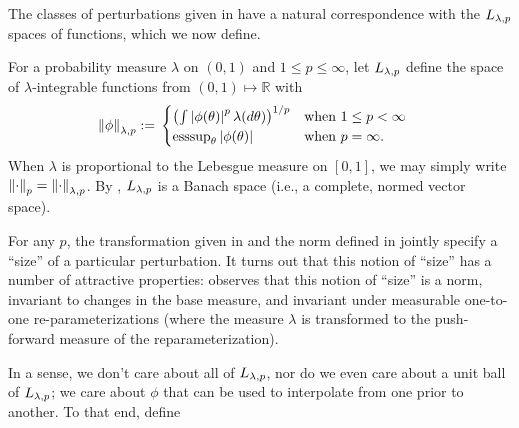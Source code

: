 The classes of perturbations given in  have a natural
correspondence with the ${L_{\lambda, p}}$ spaces of functions, which we now
define.


\begin{defn}
%
For a probability measure $\lambda$ on $(0,1)$ and $1 \le p \le \infty$, let
${L_{\lambda,p}}$ define the space of $\lambda$-integrable functions from
$(0,1)\mapsto\mathbb{R}$ with
%
\begin{align*}
%
\norm{\phi}_{\lambda,p} :={}&
\begin{cases}
    \left(\int \abs{\phi(\theta)}^p \lambda(d\theta)\right)^{1/p}
    & \textrm{when }1\le p < \infty\\
    \esssup_{\theta} \abs{\phi(\theta)}
    & \textrm{when }p = \infty.
\end{cases}
%
\end{align*}
%
When $\lambda$ is proportional to the  Lebesgue measure on $[0,1]$, we may
simply write $\left\Vert\cdot\right\Vert_{p} = \left\Vert\cdot\right\Vert_{\lambda,p}$.
%
By \citep[Theorem 5.2.1]{dudley:2018:real}, ${L_{\lambda,p}}$ is a Banach
space (i.e., a complete, normed vector space).
%
\end{defn}


For any $p$, the transformation given in  and the norm
defined in  jointly specify a ``size'' of a particular
perturbation.   It turns out that this notion of ``size'' has a number of
attractive properties: \citep[Result 2]{gustafson:1996:local} observes that this
notion of ``size'' is a norm, invariant to changes in the base measure, and
invariant under measurable one-to-one re-parameterizations (where the measure
$\lambda$ is transformed to the push-forward measure of the reparameterization).

In a sense, we don't care about all of ${L_{\lambda,p}}$, nor do we even care
about a unit ball of ${L_{\lambda,p}}$; we care about $\phi$ that can be
used to interpolate from one prior to another.  To that end, define


